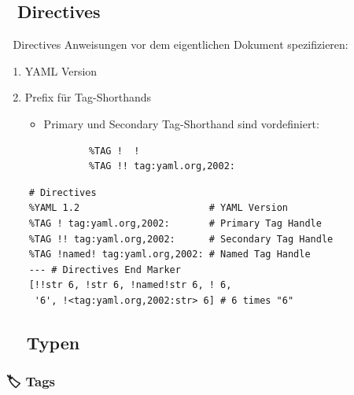 \documentclass{beamer}
\begin{document}
\subsection{📢 Directives}

\begin{frame}[fragile]{📢 Directives}
  Anweisungen vor dem eigentlichen Dokument spezifizieren:
  \begin{enumerate}
    \item YAML Version 
    \item Prefix für Tag-Shorthands 
    \begin{itemize}
      \item Primary und Secondary Tag-Shorthand sind vordefiniert:
      \begin{verbatim}
        %TAG !  !
        %TAG !! tag:yaml.org,2002:
      \end{verbatim}
    \end{itemize}
  \end{enumerate}
  \begin{verbatim}
    # Directives
    %YAML 1.2                       # YAML Version
    %TAG ! tag:yaml.org,2002:       # Primary Tag Handle
    %TAG !! tag:yaml.org,2002:      # Secondary Tag Handle
    %TAG !named! tag:yaml.org,2002: # Named Tag Handle
    --- # Directives End Marker
    [!!str 6, !str 6, !named!str 6, ! 6,
     '6', !<tag:yaml.org,2002:str> 6] # 6 times "6"
  \end{verbatim}
\end{frame}

\subsection{🐠🐙🐶 Typen}

\subsubsection{🏷 Tags}
\end{document}
